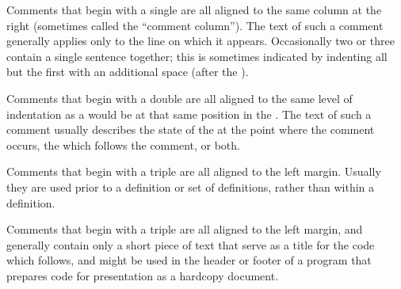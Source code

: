 

Comments that begin with a single  are all aligned to 
the same column at the right (sometimes called the ``comment column'').
The text of such a comment generally applies only to the line on which it appears.
Occasionally two or three contain a single sentence together;
this is sometimes indicated by indenting all but the first with an additional
space (after the ).

\endsubsubsubsubsection%



Comments that begin with a double  are all aligned to
the same level of indentation as a  would be at that same
position in the .
The text of such a comment usually describes
    the state of the  at the point where the comment occurs,
    the  which follows the comment,
 or both.

\endsubsubsubsubsection%



Comments that begin with a triple  are all aligned to
the left margin.  Usually they are used prior to a definition or set
of definitions, rather than within a definition.

\endsubsubsubsubsection%



Comments that begin with a triple  are all aligned to
the left margin, and generally contain only a short piece of text that
serve as a title for the code which follows, and might be used in the
header or footer of a program that prepares code for presentation as 
a hardcopy document.

\endsubsubsubsubsection%


